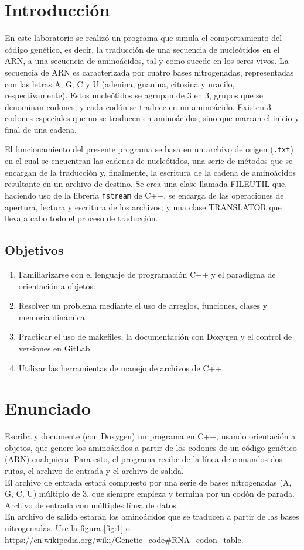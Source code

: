 \section{Introducción}
En este laboratorio se realizó un programa que simula el comportamiento del código genético, es decir, la traducción de una secuencia de nucleótidos en el ARN, a una secuencia de aminoácidos, tal y como sucede en los seres vivos. La secuencia de ARN es caracterizada por cuatro bases nitrogenadas, representadas con las letras A, G, C y U (adenina, guanina, citosina y uracilo, respectivamente). Estos nucleótidos se agrupan de 3 en 3, grupos que se denominan codones, y cada codón se traduce en un aminoácido. Existen 3 codones especiales que no se traducen en aminoácidos, sino que marcan el inicio y final de una cadena.

El funcionamiento del presente programa se basa en un archivo de origen (\texttt{.txt}) en el cual se encuentran las cadenas de nucleótidos, una serie de métodos que se encargan de la traducción y, finalmente, la escritura de la cadena de aminoácidos resultante en un archivo de destino. Se crea una clase llamada FILEUTIL que, haciendo uso de la librería \texttt{fstream} de C++, se encarga de las operaciones de apertura, lectura y escritura de los archivos; y una clase TRANSLATOR que lleva a cabo todo el proceso de traducción.


\subsection{Objetivos}
\begin{enumerate}
\item Familiarizarse con el lenguaje de programación C++ y el paradigma de orientación a objetos.
\item Resolver un problema mediante el uso de arreglos, funciones, clases y memoria dinámica.
\item Practicar el uso de makefiles, la documentación con Doxygen y el control de versiones en GitLab.
\item Utilizar las herramientas de manejo de archivos de C++.
\end{enumerate}

\section{Enunciado}
Escriba y documente (con Doxygen) un programa en C++, usando orientación a objetos, que genere los aminoácidos a partir de los codones de un código genético (ARN) cualquiera. Para esto,
el programa recibe de la línea de comandos dos rutas, el archivo de entrada y el archivo de salida.\\
El archivo de entrada estará compuesto por una serie de bases nitrogenadas (A, G, C, U) múltiplo de 3, que siempre empieza y termina por un codón de parada.\\
Archivo de entrada con múltiples línea de datos.\\
En archivo de salida estarán los aminoácidos que se traducen a partir de las bases nitrogenadas.
Use la figura \ref{fig:1} o \url{https://en.wikipedia.org/wiki/Genetic_code#RNA_codon_table}.


